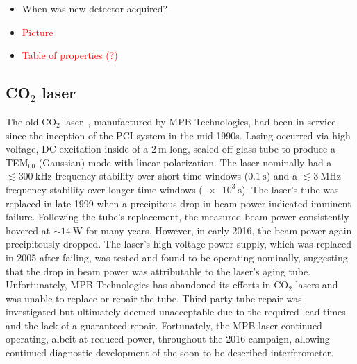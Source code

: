 \begin{itemize}
  \item When was new detector acquired?
  \item \textcolor{red}{Picture}
  \item \textcolor{red}{Table of properties (?)}
\end{itemize}


\subsection{CO$_2$ laser}
The old CO$_2$ laser~\cite[Sec.~3.3]{coda_phd},
manufactured by MPB Technologies,
had been in service since
the inception of the \diiid \space PCI system in the mid-1990s.
Lasing occurred via high voltage, DC-excitation
inside of a $\SI{2}{\meter}$-long, sealed-off glass tube
to produce a TEM$_{00}$ (Gaussian) mode with linear polarization.
The laser nominally had
a $\lesssim \SI{300}{\kilo\hertz}$ frequency stability
over short time windows ($\SI{0.1}{\second}$) and
a $\lesssim \SI{3}{\mega\hertz}$ frequency stability
over longer time windows ($\SI{e3}{\second}$).
The laser's tube was replaced in late 1999
when a precipitous drop in beam power indicated imminent failure.
Following the tube's replacement,
the measured beam power consistently hovered at $\sim\SI{14}{\watt}$
for many years.
However, in early 2016, the beam power again precipitously dropped.
The laser's high voltage power supply,
which was replaced in 2005 after failing,
was tested and found to be operating nominally,
suggesting that the drop in beam power
was attributable to the laser's aging tube.
Unfortunately, MPB Technologies has abandoned its efforts in CO$_2$ lasers
and was unable to replace or repair the tube.
Third-party tube repair was investigated but
ultimately deemed unacceptable due to
the required lead times and the lack of a guaranteed repair.
Fortunately, the MPB laser continued operating, albeit at reduced power,
throughout the 2016 campaign, allowing continued diagnostic development
of the soon-to-be-described interferometer.

